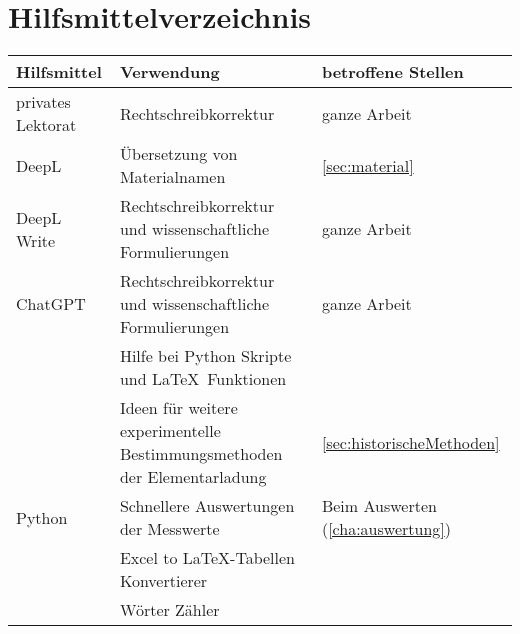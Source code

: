 \chapter*{Hilfsmittelverzeichnis}\label{cha:hilfsmittelverzeichnis}
\begin{table}[ht]
	\centering
	\begin{tabularx}{\textwidth}{l|X|X}
		\textbf{Hilfsmittel} & \textbf{Verwendung} & \textbf{betroffene Stellen} \\
		\midrule
		privates Lektorat & Rechtschreibkorrektur & ganze Arbeit \\
		\hline
		DeepL & Übersetzung von Materialnamen & \autoref{sec:material} \\
		\hline
		DeepL Write & Rechtschreibkorrektur und wissenschaftliche Formulierungen & ganze Arbeit \\
		\hline
		ChatGPT & Rechtschreibkorrektur und wissenschaftliche Formulierungen & ganze Arbeit \\
		& Hilfe bei Python Skripte und \LaTeX~Funktionen & \\
		& Ideen für weitere experimentelle Bestimmungsmethoden der Elementarladung & \autoref{sec:historischeMethoden} \\
		\hline
		Python & Schnellere Auswertungen der Messwerte  & Beim Auswerten (\autoref{cha:auswertung}) \\
		& Excel to LaTeX-Tabellen Konvertierer & \\
		& Wörter Zähler &
		
	\end{tabularx}
\end{table}